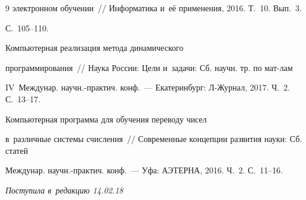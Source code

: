{{\begin{thebibliography}{9}
электронном обуче\-нии~/\!\!/ Информатика и~её применения, 2016. Т.~10. Вып.~3.  


С.~105--110.




 Компьютерная реализация метода динамического 


программирования~/\!\!/ Наука России: Цели и~задачи: Сб. научн. тр. по мат-лам 


IV~Междунар. научн.-практич. конф.~--- Екатеринбург: Л-Журнал, 2017. Ч.~2. С.~13--17.




 Компьютерная про\-грам\-ма для обуче\-ния переводу чи\-сел 


в~различные сис\-те\-мы счис\-ле\-ния~/\!\!/ Современные концепции развития науки: Сб. статей 


Междунар. научн.-практич. конф.~--- Уфа: АЭТЕРНА, 2016. Ч.~2. С.~11--16.





        \end{thebibliography}


} }








\vspace*{-3pt}





\hfill{\small\textit{Поступила в~редакцию 14.02.18}}





























\newpage





\vspace*{-28pt}





